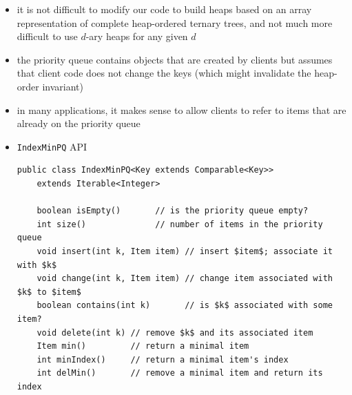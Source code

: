\documentclass[8pt,a4paper,compress]{beamer}
\begin{document}
\begin{frame}[fragile]
\begin{itemize}
\item it is not difficult to modify our code to
build heaps based on an array representation of complete heap-ordered ternary trees, and not much more difficult to use $d$-ary heaps for any given $d$

\item the priority queue contains objects that are created by clients but assumes that client code does not change the keys (which might invalidate the heap-order invariant)

\item in many applications, it makes sense to allow clients to refer to items that are already on the priority queue 
\item \lstinline{IndexMinPQ} API
\begin{lstlisting}[language={},mathescape]
public class IndexMinPQ<Key extends Comparable<Key>> 
    extends Iterable<Integer>

    boolean isEmpty()       // is the priority queue empty?
    int size()              // number of items in the priority queue
    void insert(int k, Item item) // insert $item$; associate it with $k$
    void change(int k, Item item) // change item associated with $k$ to $item$
    boolean contains(int k)       // is $k$ associated with some item?
    void delete(int k) // remove $k$ and its associated item
    Item min()         // return a minimal item
    int minIndex()     // return a minimal item's index
    int delMin()       // remove a minimal item and return its index
\end{lstlisting}
\end{itemize}
\end{frame}
\end{document}
